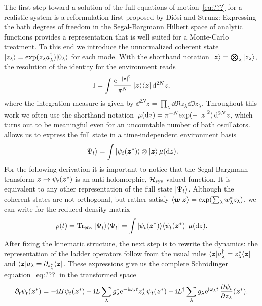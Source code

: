 The first step toward a solution of the full equations of motion~\ref{eq:???} for a realistic system is a reformulation first proposed by Diósi and Strunz\cite{DiSt97_nmsse}:
Expressing the bath degrees of freedom in the Segal-Bargmann Hilbert space of analytic functions\cite{Ba61_coherent_states,Se???} provides a representation that is well suited for a Monte-Carlo treatment.
To this end we introduce the unnormalized coherent state $\ket{z_\lambda} = \exp(z_\lambda \adj{a}_\lambda)\ket{0_\lambda}$ for each mode.
With the shorthand notation $| \boldsymbol{z} \rangle = \bigotimes_\lambda | z_\lambda \rangle$, the resolution of the identity for the environment reads
\begin{equation}
  \unit = \int \frac{\exp[-\abs{\zz}^2]}{\pi^N} \, \ket{\zz}\bra{\zz} \dd^{2N}z,
  \label{eq:nmqsd.identity}
\end{equation}
where the integration measure is given by $\dd^{2N}z = \prod_\lambda \dd\Re z_\lambda \dd\Im z_\lambda$.
Throughout this work we often use the shorthand notation $\mudz = \pi^{-N} \exp(-\abs{\vec z}^2) \dd^{2N}z$, which turns out to be meaningful even for an uncountable number of bath oscillators.
 allows us to express the full state in a time-independent environment basis
\begin{equation*}
  | \Psi_t \rangle = \int | \psi_t({\boldsymbol{z}}^*) \rangle \otimes | \boldsymbol{z} \rangle \, \mu(\mathrm{d} z).
\end{equation*}
For the following derivation it is important to notice that the Segal-Bargmann transform $\boldsymbol{z} \mapsto \psi_t({\boldsymbol{z}}^*)$ is an anti-holomorphic, $\mathcal{H}_\mathrm{sys}$ valued function.
It is equivalent to any other representation of the full state $| \Psi_t \rangle$.
Although the coherent states are not orthogonal, but rather satisfy $\braket{\vec w}{\vec z} = \exp(\sum_\lambda \cc w_\lambda z_\lambda)$, we can write for the reduced density matrix
\begin{equation}
  \rho(t) = \operatorname{Tr}_\mathrm{env} | \Psi_t \rangle\langle \Psi_t |
          = \int | \psi_t({\boldsymbol{z}}^*) \rangle\langle \psi_t({\boldsymbol{z}}^*) | \, \mu(\mathrm{d} z).
  \label{eq:nmqsd.reduced_matrix}
\end{equation}
After fixing the kinematic structure, the next step is to rewrite the dynamics: the representation of the ladder operators follow from the usual rules $\langle \boldsymbol{z} | a^\dagger_\lambda = {z}^*_\lambda \langle \boldsymbol{z} |$ and $\langle \boldsymbol{z} | a_\lambda = \partial_{{z}^*_\lambda} \langle \boldsymbol{z} |$\cite{???}.
These expressions give us the complete Schrödinger equation~\ref{eq:???} in the transformed space
\begin{equation}
  \partial_t \psi_t(\cc\zz) = -\ii\Hsys\psi_t(\cc\zz)  -  \ii L \sum_\lambda \cc g_\lambda \exp[-\ii\omega_\lambda t] \cc z_\lambda \, \psi_t(\cc\zz)  -  \ii \adj{L} \sum_\lambda g_\lambda \exp[\ii\omega_\lambda t] \, \frac{\partial \psi_t}{\partial z_\lambda}(\cc\zz).
  \label{eq:nmqsd.hamiltonian_microsopic}
\end{equation}
